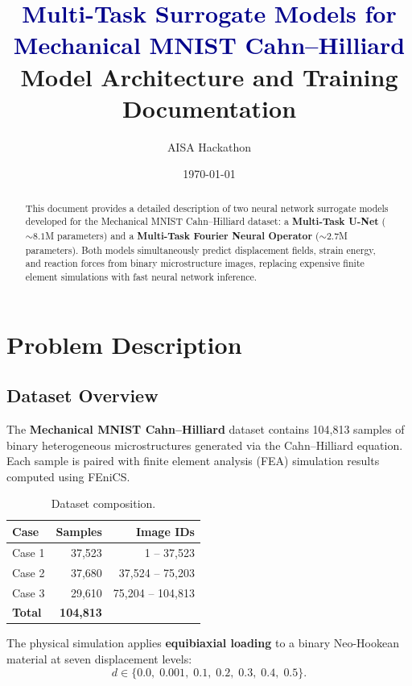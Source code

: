 \documentclass[11pt,a4paper]{article}
\title{%
    \textcolor{darkblue}{\textbf{Multi-Task Surrogate Models for\\
    Mechanical MNIST Cahn--Hilliard}}\\[0.5em]
    \large Model Architecture and Training Documentation
}
\author{AISA Hackathon}
\date{\today}
\begin{document}
\maketitle
\thispagestyle{fancy}

\begin{abstract}
This document provides a detailed description of two neural network surrogate
models developed for the Mechanical MNIST Cahn--Hilliard dataset: a
\textbf{Multi-Task U-Net} (${\sim}8.1$M parameters) and a
\textbf{Multi-Task Fourier Neural Operator} (${\sim}2.7$M parameters).
Both models simultaneously predict displacement fields, strain energy, and
reaction forces from binary microstructure images, replacing expensive finite
element simulations with fast neural network inference.
\end{abstract}

\tableofcontents
\newpage

\section{Problem Description}
\label{sec:problem}

\subsection{Dataset Overview}

The \textbf{Mechanical MNIST Cahn--Hilliard} dataset contains 104,813 samples
of binary heterogeneous microstructures generated via the Cahn--Hilliard
equation. Each sample is paired with finite element analysis (FEA) simulation
results computed using FEniCS.

\begin{table}[H]
\centering
\caption{Dataset composition.}
\label{tab:dataset}
\begin{tabular}{@{}lrr@{}}
\toprule
\textbf{Case} & \textbf{Samples} & \textbf{Image IDs} \\
\midrule
Case 1 & 37,523 & 1 -- 37,523 \\
Case 2 & 37,680 & 37,524 -- 75,203 \\
Case 3 & 29,610 & 75,204 -- 104,813 \\
\midrule
\textbf{Total} & \textbf{104,813} & \\
\bottomrule
\end{tabular}
\end{table}

The physical simulation applies \textbf{equibiaxial loading} to a binary
Neo-Hookean material at seven displacement levels:
\[
    d \in \{0.0,\; 0.001,\; 0.1,\; 0.2,\; 0.3,\; 0.4,\; 0.5\}.
\]
\end{document}
